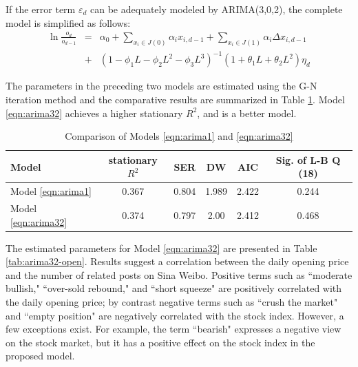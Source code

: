 \documentclass[review,3p,times,12pt,number]{elsarticle}
\begin{document}
If the error term $\varepsilon_d$ can be adequately modeled by ARIMA(3,0,2), the complete model is simplified as follows:
\begin{eqnarray}
    \ln \frac{o_d}{o_{d-1}} & = & \alpha_0 + \sum_{x_i \in J(0)} \alpha_i x_{i,d-1} + \sum_{x_i \in J(1)} \alpha_i \Delta x_{i,d-1} \nonumber \\
                           & + & (1-\phi_1L-\phi_2L^2-\phi_3L^3)^{-1}(1 + \theta_1 L + \theta_2 L^2) \eta_d \label{eqn:arima32}
\end{eqnarray}

The parameters in the preceding two models are estimated using the G-N iteration method and the comparative results are summarized in Table \ref{tab:comp}. Model \ref{eqn:arima32} achieves a higher stationary $R^2$, and is a better model.

\begin{table}[htbp]
\caption{Comparison of Models \ref{eqn:arima1} and \ref{eqn:arima32}}
\label{tab:comp}
\center
\begin{tabular} {l c c c c c}
\hline
Model                   & stationary $R^2$ & SER   & DW    & AIC   & Sig. of L-B Q (18)\\
\hline
Model \ref{eqn:arima1}  & 0.367            & 0.804 & 1.989 & 2.422 & 0.244\\
Model \ref{eqn:arima32} & 0.374            & 0.797 & 2.00  & 2.412 & 0.468\\
\hline
\end{tabular}
\end{table}

The estimated parameters for Model \ref{eqn:arima32} are presented in Table \ref{tab:arima32-open}. Results suggest a correlation between the daily opening price and the number of related posts on Sina Weibo. Positive terms such as ``moderate bullish," ``over-sold rebound," and ``short squeeze" are positively correlated with the daily opening price; by contrast negative terms such as ``crush the market" and ``empty position" are negatively correlated with the stock index. However, a few exceptions exist. For example, the term ``bearish" expresses a negative view on the stock market, but it has a positive effect on the stock index in the proposed model.
\end{document}
